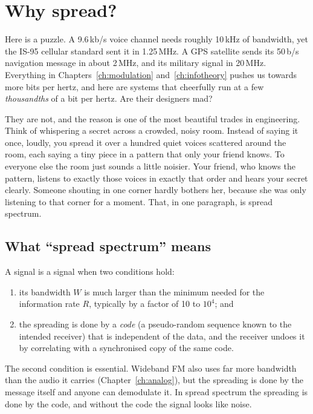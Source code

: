 \section{Why spread?}
\label{sec:ch18:why}

Here is a puzzle. A 9.6\,kb/s voice channel needs roughly 10\,kHz of bandwidth, yet the IS-95
cellular standard sent it in 1.25\,MHz. A GPS satellite sends its 50\,b/s navigation message in
about 2\,MHz, and its military signal in 20\,MHz. Everything in Chapters~\ref{ch:modulation}
and~\ref{ch:infotheory} pushes us towards more bits per hertz, and here are systems that
cheerfully run at a few \emph{thousandths} of a bit per hertz. Are their designers mad?

They are not, and the reason is one of the most beautiful trades in engineering. Think of
whispering a secret across a crowded, noisy room. Instead of saying it once, loudly, you spread
it over a hundred quiet voices scattered around the room, each saying a tiny piece in a pattern
that only your friend knows. To everyone else the room just sounds a little noisier. Your friend,
who knows the pattern, listens to exactly those voices in exactly that order and hears your
secret clearly. Someone shouting in one corner hardly bothers her, because she was only listening
to that corner for a moment. That, in one paragraph, is spread spectrum.

\subsection{What ``spread spectrum'' means}

A signal is a  signal when two conditions hold:
\begin{enumerate}
\item its bandwidth $W$ is much larger than the minimum needed for the information rate
$R$, typically by a factor of 10 to $10^4$; and
\item the spreading is done by a \emph{code} (a pseudo-random sequence known to the
intended receiver) that is independent of the data, and the receiver undoes it by
correlating with a synchronised copy of the same code.
\end{enumerate}
The second condition is essential. Wideband FM also uses far more bandwidth than the audio
it carries (Chapter~\ref{ch:analog}), but the spreading is done by the message itself and
anyone can demodulate it. In spread spectrum the spreading is done by the code, and without
the code the signal looks like noise.


